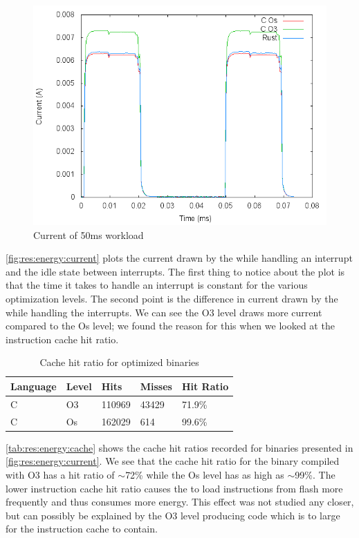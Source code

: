 \begin{figure}[H]
  \includegraphics[width=\textwidth]{results/plots/energy/irq/50.png}
  \caption{Current of 50ms workload}
  \label{fig:res:energy:current}
\end{figure}

\autoref{fig:res:energy:current} plots the current drawn by the {\gecko} while handling an interrupt and the idle state between interrupts.
The first thing to notice about the plot is that the time it takes to handle an interrupt is constant for the various optimization levels.
The second point is the difference in current drawn by the {\gecko} while handling the interrupts.
We can see the O3 level draws more current compared to the Os level; we found the reason for this when we looked at the instruction cache hit ratio.

\begin{table}[H]
  \centering
  \begin{tabular}{l | l | l | l | l}
    \textbf{Language} & \textbf{Level} & \textbf{Hits} & \textbf{Misses} & \textbf{Hit Ratio} \\
    \hline
    C & O3 & 110969 & 43429 & 71.9\% \\
    C & Os & 162029 & 614 & 99.6\% \\
    \hline
  \end{tabular}
  \caption{Cache hit ratio for optimized {\C} binaries}
  \label{tab:res:energy:cache}
\end{table}

\autoref{tab:res:energy:cache} shows the cache hit ratios recorded for binaries presented in \autoref{fig:res:energy:current}.
We see that the cache hit ratio for the binary compiled with O3 has a hit ratio of $\sim$72\% while the Os level has as high as $\sim$99\%.
The lower instruction cache hit ratio causes the {\gecko} to load instructions from flash more frequently and thus consumes more energy.
This effect was not studied any closer, but can possibly be explained by the O3 level producing code which is to large for the instruction cache to contain.
